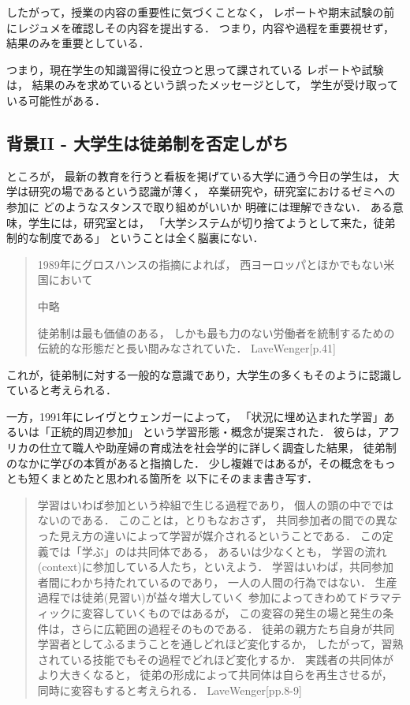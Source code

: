 \documentclass[a4,p11]{article}
\begin{document}
したがって，授業の内容の重要性に気づくことなく，
レポートや期末試験の前にレジュメを確認しその内容を提出する．
つまり，内容や過程を重要視せず，結果のみを重要としている．

つまり，現在学生の知識習得に役立つと思って課されている
レポートや試験は，
結果のみを求めているという誤ったメッセージとして，
学生が受け取っている可能性がある．

\subsection{背景II - 大学生は徒弟制を否定しがち}
\label{sec:org93254f0}
ところが，
最新の教育を行うと看板を掲げている大学に通う今日の学生は，
大学は研究の場であるという認識が薄く，
卒業研究や，研究室におけるゼミへの参加に
どのようなスタンスで取り組めがいいか
明確には理解できない．
ある意味，学生には，研究室とは，
「大学システムが切り捨てようとして来た，徒弟制的な制度である」
ということは全く脳裏にない．

\begin{quote}
1989年にグロスハンスの指摘によれば，
西ヨーロッパとほかでもない米国において

中略

徒弟制は最も価値のある，
しかも最も力のない労働者を統制するための伝統的な形態だと長い間みなされていた．
LaveWenger[p.41]
\end{quote}
これが，徒弟制に対する一般的な意識であり，大学生の多くもそのように認識していると考えられる．

一方，1991年にレイヴとウェンガーによって，
  「状況に埋め込まれた学習」あるいは「正統的周辺参加」
  という学習形態・概念が提案された．
  彼らは，アフリカの仕立て職人や助産婦の育成法を社会学的に詳しく調査した結果，
  徒弟制のなかに学びの本質があると指摘した．
少し複雑ではあるが，その概念をもっとも短くまとめたと思われる箇所を
以下にそのまま書き写す．
\begin{quote}
  学習はいわば参加という枠組で生じる過程であり，
  個人の頭の中でではないのである．
  このことは，とりもなおさず，
共同参加者の間での異なった見え方の違いによって学習が媒介されるということである．
この定義では「学ぶ」のは共同体である，
あるいは少なくとも，
学習の流れ(context)に参加している人たち，といえよう．
学習はいわば，共同参加者間にわかち持たれているのであり，
一人の人間の行為ではない．
生産過程では徒弟(見習い)が益々増大していく
参加によってきわめてドラマティックに変容していくものではあるが，
この変容の発生の場と発生の条件は，さらに広範囲の過程そのものである．
徒弟の親方たち自身が共同学習者としてふるまうことを通しどれほど変化するか，
したがって，習熟されている技能でもその過程でどれほど変化するか．
実践者の共同体がより大きくなると，
徒弟の形成によって共同体は自らを再生させるが，
同時に変容もすると考えられる．
LaveWenger[pp.8-9]
\end{quote}
\end{document}
